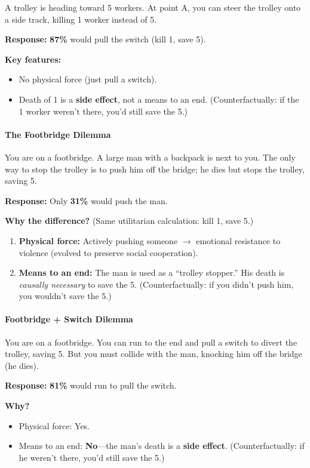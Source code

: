 A trolley is heading toward 5 workers. At point A, you can steer the trolley onto a side track, killing 1 worker instead of 5.

\textbf{Response:} \textbf{87\%} would pull the switch (kill 1, save 5).

\textbf{Key features:}
\begin{itemize}
  \item No physical force (just pull a switch).
  \item Death of 1 is a \textbf{side effect}, not a means to an end. (Counterfactually: if the 1 worker weren't there, you'd still save the 5.)
\end{itemize}

\separator

\paragraph*{The Footbridge Dilemma}

You are on a footbridge. A large man with a backpack is next to you. The only way to stop the trolley is to push him off the bridge; he dies but stops the trolley, saving 5.

\textbf{Response:} Only \textbf{31\%} would push the man.

\textbf{Why the difference?} (Same utilitarian calculation: kill 1, save 5.)
\begin{enumerate}
  \item \textbf{Physical force:} Actively pushing someone $\to$ emotional resistance to violence (evolved to preserve social cooperation).
  \item \textbf{Means to an end:} The man is used as a ``trolley stopper.'' His death is \textit{causally necessary} to save the 5. (Counterfactually: if you didn't push him, you wouldn't save the 5.)
\end{enumerate}

\separator

\paragraph*{Footbridge + Switch Dilemma}

You are on a footbridge. You can run to the end and pull a switch to divert the trolley, saving 5. But you must collide with the man, knocking him off the bridge (he dies).

\textbf{Response:} \textbf{81\%} would run to pull the switch.

\textbf{Why?}
\begin{itemize}
  \item Physical force: Yes.
  \item Means to an end: \textbf{No}---the man's death is a \textbf{side effect}. (Counterfactually: if he weren't there, you'd still save the 5.)
\end{itemize}

